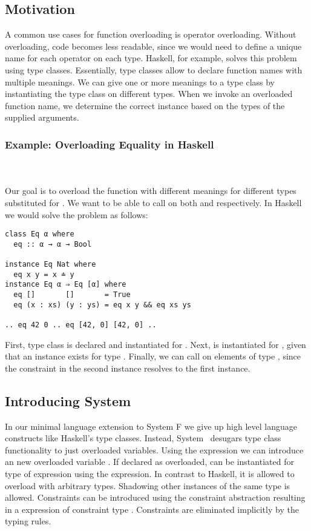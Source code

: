 \subsection{Motivation}
A common use cases for function overloading is operator overloading. Without overloading, code becomes less readable, since we would need to define a unique name for each operator on each type.
Haskell, for example, solves this problem using type classes.
Essentially, type classes allow to declare function names with multiple meanings. We can give one or more meanings to a type class by instantiating the type class on different types. 
When we invoke an overloaded function name, we determine the correct instance based on the types of the supplied arguments. 
\subsubsection{Example: Overloading Equality in Haskell}\hfill\\\\
Our goal is to overload the function  with different meanings for different types substituted for . We want to be able to call  on both  and \mono{[Nat]} respectively. In Haskell we would solve the problem as follows:
\begin{verbatim}
class Eq α where
  eq :: α → α → Bool 

instance Eq Nat where
  eq x y = x ≐ y
instance Eq α ⇒ Eq [α] where
  eq []       []       = True
  eq (x : xs) (y : ys) = eq x y && eq xs ys 

.. eq 42 0 .. eq [42, 0] [42, 0] ..
\end{verbatim}
First, type class  is declared and instantiated for . 
Next,  is instantiated for \mono{[α]}, given that an instance  exists for type . 
Finally, we can call  on elements of type \mono{[Nat]}, since the constraint  in the second instance resolves to the first instance.
\subsection{Introducing System \Fo}
In our minimal language extension to System F we give up high level language constructs like Haskell's type classes. 
Instead, System \Fo\ desugars type class functionality to just overloaded variables. 
Using the  expression we can introduce an new overloaded variable . 
If declared as overloaded,  can be instantiated for type  of expression  using the  expression.
In contrast to Haskell, it is allowed to overload  with arbitrary types. 
Shadowing other instances of the same type is allowed.
Constraints can be introduced using the constraint abstraction  resulting in a expression of constraint type . Constraints are eliminated implicitly by the typing rules.

